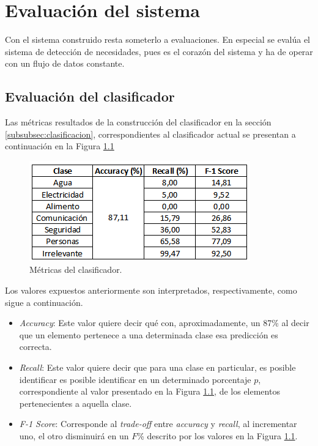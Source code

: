 \chapter{Evaluación del sistema}
\label{cap:experimentos}

Con el sistema construido resta someterlo a evaluaciones. En especial se evalúa el sistema de detección de necesidades, pues es el corazón del sistema y ha de operar con un flujo de datos constante.

\section{Evaluación del clasificador}
\label{sec:EvalClassificador}

Las métricas resultados de la construcción del clasificador en la sección \ref{subsubsec:clasificacion}, correspondientes al clasificador actual se presentan a continuación en la Figura \ref{fig:metricasClass} 
\begin{figure}[H]
        \centering
        \captionsetup{justification=centering}
        \includegraphics[scale=0.8]{images/MetricasClasificador.png}
        \caption[Métricas del clasificador.]{Métricas del clasificador.}
        \label{fig:metricasClass}
\end{figure}

Los valores expuestos anteriormente son interpretados, respectivamente, como sigue a continuación.

\begin{itemize}
\item \textit{Accuracy}: Este valor quiere decir qué con, aproximadamente, un 87\% al decir que un elemento pertenece a una determinada clase esa predicción es correcta.
\item \textit{Recall}: Este valor quiere decir que para una clase en particular, es posible identificar es posible identificar en un determinado porcentaje $p$, correspondiente al valor presentado en la Figura \ref{fig:metricasClass}, de los elementos pertenecientes a aquella clase.
\item \textit{F-1 Score}: Corresponde al \textit{trade-off} entre \textit{accuracy} y \textit{recall}, al incrementar uno, el otro disminuirá en un $F$\% descrito por los valores en la Figura \ref{fig:metricasClass}.
\end{itemize}

